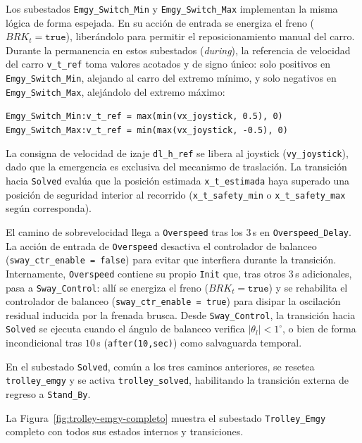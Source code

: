 \documentclass[12pt, a4paper]{article}
\begin{document}
Los subestados \texttt{Emgy\_Switch\_Min} y \texttt{Emgy\_Switch\_Max} implementan la
misma lógica de forma espejada. En su acción de entrada se energiza el freno
($BRK_t = \texttt{true}$), liberándolo para permitir el reposicionamiento manual del
carro. Durante la permanencia en estos subestados (\textit{during}), la referencia de
velocidad del carro \texttt{v\_t\_ref} toma valores acotados y de signo único: solo
positivos en \texttt{Emgy\_Switch\_Min}, alejando al carro del extremo mínimo, y solo
negativos en \texttt{Emgy\_Switch\_Max}, alejándolo del extremo máximo:

\begin{center}
    \texttt{Emgy\_Switch\_Min:}\quad\texttt{v\_t\_ref = max(min(vx\_joystick, 0.5), 0)} \\[6pt]
    \texttt{Emgy\_Switch\_Max:}\quad\texttt{v\_t\_ref = min(max(vx\_joystick, -0.5), 0)}
\end{center}

La consigna de velocidad de izaje \texttt{dl\_h\_ref} se libera al joystick
(\texttt{vy\_joystick}), dado que la emergencia es exclusiva del mecanismo de
traslación. La transición hacia \texttt{Solved} evalúa que la posición estimada
\texttt{x\_t\_estimada} haya superado una posición de seguridad interior al recorrido
(\texttt{x\_t\_safety\_min} o \texttt{x\_t\_safety\_max} según corresponda).

El camino de sobrevelocidad llega a \texttt{Overspeed} tras los $3$\,s en
\texttt{Overspeed\_Delay}. La acción de entrada de \texttt{Overspeed} desactiva el
controlador de balanceo (\texttt{sway\_ctr\_enable = false}) para evitar que interfiera
durante la transición. Internamente, \texttt{Overspeed} contiene su propio \texttt{Init}
que, tras otros $3$\,s adicionales, pasa a \texttt{Sway\_Control}: allí se energiza el
freno ($BRK_t = \texttt{true}$) y se rehabilita el controlador de balanceo
(\texttt{sway\_ctr\_enable = true}) para disipar la oscilación residual inducida por la
frenada brusca. Desde \texttt{Sway\_Control}, la transición hacia \texttt{Solved} se
ejecuta cuando el ángulo de balanceo verifica $|\theta_l| < 1^\circ$, o bien de forma
incondicional tras $10$\,s (\texttt{after(10,sec)}) como salvaguarda temporal.

En el subestado \texttt{Solved}, común a los tres caminos anteriores, se resetea
\texttt{trolley\_emgy} y se activa \texttt{trolley\_solved}, habilitando la transición
externa de regreso a \texttt{Stand\_By}.

La Figura~\ref{fig:trolley-emgy-completo} muestra el subestado \texttt{Trolley\_Emgy}
completo con todos sus estados internos y transiciones.
\end{document}
